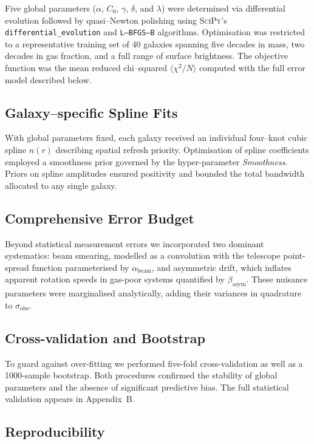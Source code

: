 \documentclass[twocolumn,prd,amsmath,amssymb,aps,superscriptaddress,nofootinbib]{revtex4-2}
\begin{document}
Five global parameters ($\alpha$, $C_0$, $\gamma$, $\delta$, and $\lambda$) were determined via differential evolution followed by quasi–Newton polishing using \textsc{SciPy}'s \texttt{differential\_evolution} and \texttt{L–BFGS–B} algorithms. Optimisation was restricted to a representative training set of 40 galaxies spanning five decades in mass, two decades in gas fraction, and a full range of surface brightness. The objective function was the mean reduced chi–squared $\langle\chi^2/N\rangle$ computed with the full error model described below.

\subsection{Galaxy–specific Spline Fits}

With global parameters fixed, each galaxy received an individual four–knot cubic spline $n(r)$ describing spatial refresh priority. Optimisation of spline coefficients employed a smoothness prior governed by the hyper-parameter \textit{Smoothness}. Priors on spline amplitudes ensured positivity and bounded the total bandwidth allocated to any single galaxy.

\subsection{Comprehensive Error Budget}

Beyond statistical measurement errors we incorporated two dominant systematics: beam smearing, modelled as a convolution with the telescope point-spread function parameterised by $\alpha_{\mathrm{beam}}$, and asymmetric drift, which inflates apparent rotation speeds in gas-poor systems quantified by $\beta_{\mathrm{asym}}$. These nuisance parameters were marginalised analytically, adding their variances in quadrature to $\sigma_{\text{obs}}$.

\subsection{Cross-validation and Bootstrap}

To guard against over-fitting we performed five-fold cross-validation as well as a 1000-sample bootstrap. Both procedures confirmed the stability of global parameters and the absence of significant predictive bias. The full statistical validation appears in Appendix~B.

\subsection{Reproducibility}
\end{document}
